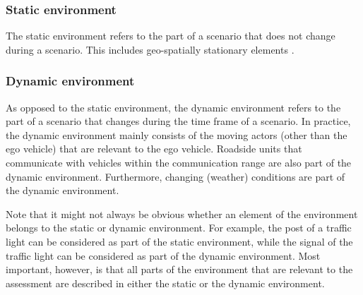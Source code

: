 
\subsubsection{Static environment}
\label{sec:static environment}
The static environment refers to the part of a scenario that does not change during a scenario. This includes geo-spatially stationary elements \cite{ulbrich2015}. 

\subsubsection{Dynamic environment}
\label{sec:dynamic environment}
As opposed to the static environment, the dynamic environment refers to the part of a scenario that changes during the time frame of a scenario. 
In practice, the dynamic environment mainly consists of the moving actors (other than the ego vehicle) that are relevant to the ego vehicle. 
Roadside units that communicate with vehicles within the communication range \cite{alsultan2014comprehensive} are also part of the dynamic environment. Furthermore, changing (weather) conditions are part of the dynamic environment.

Note that it might not always be obvious whether an element of the environment belongs to the static or dynamic environment. For example, the post of a traffic light can be considered as part of the static environment, while the signal of the traffic light can be considered as part of the dynamic environment. Most important, however, is that all parts of the environment that are relevant to the assessment are described in either the static or the dynamic environment.

